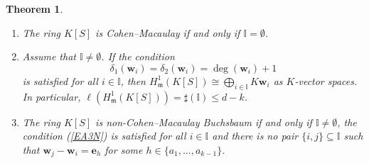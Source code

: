 \documentclass[11pt]{article}
\newtheorem{Theorem}{Theorem}[section]
\def\deg{\operatorname{deg}}
\def\mfr{{\frak m}}
\def\ebf{{\mathbf e}}
\def\wbf{{\mathbf w}}
\def\mfr{{\mathfrak m}}
\def\Iset{{\mathbb I}}
\theoremstyle{remark}
\theoremstyle{definition}
\begin{document}
\begin{Theorem} \label{A3New} 
\begin{enumerate}[\((i)\)]
    \item The ring $K[S]$ is  Cohen--Macaulay if and only if $\Iset = \emptyset$.
    \item Assume that $\Iset \neq \emptyset$. 
If the condition 
\begin{equation} \label{EA3N}
\delta_1(\wbf_i) = \delta_2(\wbf_i) = \deg(\wbf_i) + 1
\end{equation}
 is satisfied for all $i\in \Iset$, then $H^1_\mfr(K[S])\cong \bigoplus_{i\in \Iset}K\wbf_i$ as $K$-vector spaces. In particular,   $\ell ( H^1_\mfr(K[S])) = \sharp(\Iset) \leq d- k$.
 \item The ring $K[S]$ is  non-Cohen--Macaulay Buchsbaum if and only if $\Iset \neq \emptyset$, the condition (\ref{EA3N}) is satisfied  for all $i \in \Iset$ and there is no pair $\{i,j\} \subseteq \Iset$ such that  $\wbf_j - \wbf_i = \ebf_h$ for some $h\in \{a_1,\ldots,a_{k-1} \}$.
\end{enumerate}
\end{Theorem}
\end{document}

